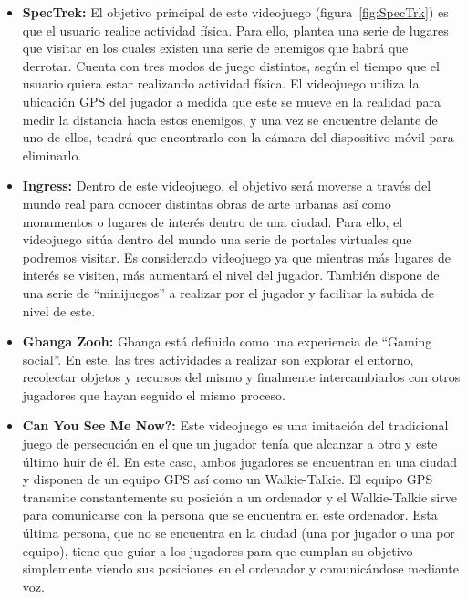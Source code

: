 \begin{itemize}

\item \textbf{SpecTrek:} El objetivo principal de este videojuego (figura~\ref{fig:SpecTrk}) es que el usuario realice actividad física. Para ello, plantea una serie de lugares que visitar en los cuales existen una serie de enemigos que habrá que derrotar. Cuenta con tres modos de juego distintos, según el tiempo que el usuario quiera estar realizando actividad física. El videojuego utiliza la ubicación GPS del jugador a medida que este se mueve en la realidad para medir la distancia hacia estos enemigos, y una vez se encuentre delante de uno de ellos, tendrá que encontrarlo con la cámara del dispositivo móvil para eliminarlo.

\item \textbf{Ingress:} Dentro de este videojuego, el objetivo será moverse a través del mundo real para conocer distintas obras de arte urbanas así como monumentos o lugares de interés dentro de una ciudad. Para ello, el videojuego sitúa dentro del mundo una serie de portales virtuales que podremos visitar. Es considerado videojuego ya que mientras más lugares de interés se visiten, más aumentará el nivel del jugador. También dispone de una serie de ``minijuegos'' a realizar por el jugador y facilitar la subida de nivel de este.

\item \textbf{Gbanga Zooh:} Gbanga está definido como una experiencia de ``Gaming social''. En este, las tres actividades a realizar son explorar el entorno, recolectar objetos y recursos del mismo y finalmente intercambiarlos con otros jugadores que hayan seguido el mismo proceso. 

\item \textbf{Can You See Me Now?:} Este videojuego es una imitación del tradicional juego de persecución en el que un jugador tenía que alcanzar a otro y este último huir de él. En este caso, ambos jugadores se encuentran en una ciudad y disponen de un equipo GPS así como un Walkie-Talkie. El equipo GPS transmite constantemente su posición a un ordenador y el Walkie-Talkie sirve para comunicarse con la persona que se encuentra en este ordenador.
Esta última persona, que no se encuentra en la ciudad (una por jugador o una por equipo), tiene que guiar a los jugadores para que cumplan su objetivo simplemente viendo sus posiciones en el ordenador y comunicándose mediante voz. \\



\end{itemize}
